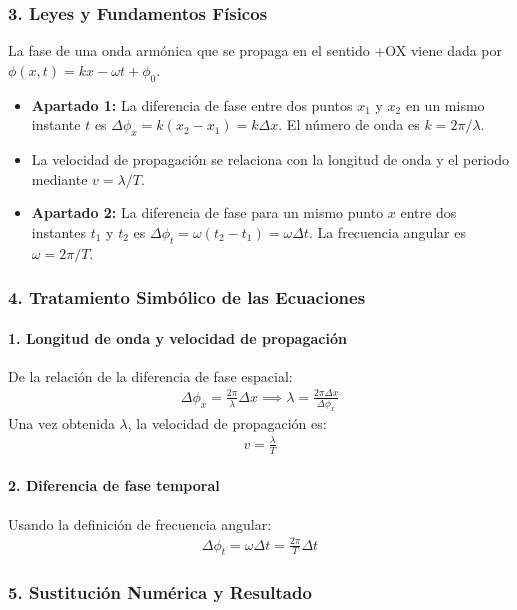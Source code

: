 \subsubsection*{3. Leyes y Fundamentos Físicos}
La fase de una onda armónica que se propaga en el sentido +OX viene dada por $\phi(x,t) = kx - \omega t + \phi_0$.
\begin{itemize}
    \item \textbf{Apartado 1:} La diferencia de fase entre dos puntos $x_1$ y $x_2$ en un mismo instante $t$ es $\Delta\phi_x = k(x_2-x_1) = k \Delta x$. El número de onda es $k = 2\pi/\lambda$.
    \item La velocidad de propagación se relaciona con la longitud de onda y el periodo mediante $v = \lambda/T$.
    \item \textbf{Apartado 2:} La diferencia de fase para un mismo punto $x$ entre dos instantes $t_1$ y $t_2$ es $\Delta\phi_t = \omega(t_2-t_1) = \omega \Delta t$. La frecuencia angular es $\omega = 2\pi/T$.
\end{itemize}

\subsubsection*{4. Tratamiento Simbólico de las Ecuaciones}
\paragraph{1. Longitud de onda y velocidad de propagación}
De la relación de la diferencia de fase espacial:
\begin{gather}
    \Delta\phi_x = \frac{2\pi}{\lambda} \Delta x \implies \lambda = \frac{2\pi \Delta x}{\Delta\phi_x}
\end{gather}
Una vez obtenida $\lambda$, la velocidad de propagación es:
\begin{gather}
    v = \frac{\lambda}{T}
\end{gather}

\paragraph{2. Diferencia de fase temporal}
Usando la definición de frecuencia angular:
\begin{gather}
    \Delta\phi_t = \omega \Delta t = \frac{2\pi}{T} \Delta t
\end{gather}

\subsubsection*{5. Sustitución Numérica y Resultado}
